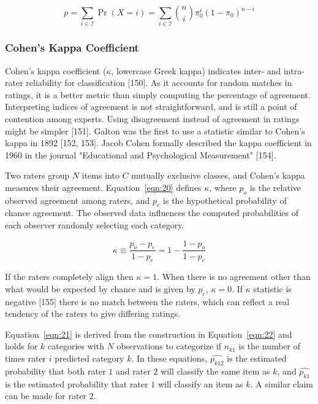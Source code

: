 \documentclass[sn-mathphys-num]{sn-jnl}%
\begin{document}
\begin{equation}
	p=\sum_{i\in {\mathcal{I}}}\Pr(X=i)=\sum_{i\in {\mathcal{I}}}{\binom{n}{i}}\pi_{0}^{i}(1-\pi_{0})^{n-i}
	\label{eqn:19}
\end{equation}

\subsubsection{Cohen's Kappa Coefficient}

Cohen's kappa coefficient ($\kappa$, lowercase Greek kappa) indicates inter- and intra-rater reliability for classification [150]. As it accounts for random matches in ratings, it is a better metric than simply computing the percentage of agreement. Interpreting indices of agreement is not straightforward, and is still a point of contention among experts. Using disagreement instead of agreement in ratings might be simpler [151]. Galton was the first to use a statistic similar to Cohen's kappa in 1892 [152, 153]. Jacob Cohen formally described the kappa coefficient in 1960 in the journal "Educational and Psychological Measurement" [154].

Two raters group $N$ items into $C$ mutually exclusive classes, and Cohen's kappa measures their agreement. Equation~\ref{eqn:20} defines $\kappa$, where $p_{o}$ is the relative observed agreement among raters, and $p_{e}$ is the hypothetical probability of chance agreement. The observed data influences the computed probabilities of each observer randomly selecting each category.

\begin{equation}
	\kappa \equiv {\frac {p_{o}-p_{e}}{1-p_{e}}}=1-{\frac {1-p_{o}}{1-p_{e}}}
	\label{eqn:20}
\end{equation}

If the raters completely align then $\kappa = 1$. When there is no agreement other than what would be expected by chance and is given by $p_{e}$, $\kappa = 0$. If $\kappa$ statistic is negative [155] there is no match between the raters, which can reflect a real tendency of the raters to give differing ratings.

Equation~\ref{eqn:21} is derived from the construction in Equation~\ref{eqn:22} and holds for $k$ categories with $N$ observations to categorize if $n_{k1}$ is the number of times rater $i$ predicted category $k$. In these equations, ${\widehat{p_{k12}}}$ is the estimated probability that both rater $1$ and rater $2$ will classify the same item as $k$, and ${\widehat {p_{k1}}}$ is the estimated probability that rater $1$ will classify an item as $k$. A similar claim can be made for rater $2$.
\end{document}
